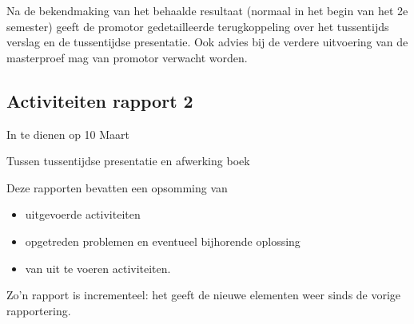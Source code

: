 \documentclass{scrartcl}
\begin{document}
Na de bekendmaking van het behaalde resultaat (normaal in het begin van het 2e semester) geeft de promotor gedetailleerde terugkoppeling over het tussentijds verslag en de tussentijdse presentatie. Ook advies bij de verdere uitvoering van de masterproef mag van promotor verwacht worden.



\subsection{Activiteiten rapport 2}

In te dienen op 10 Maart



Tussen tussentijdse presentatie  en afwerking boek

Deze rapporten bevatten een opsomming van 

\begin{itemize}
\item uitgevoerde activiteiten
\item opgetreden problemen en eventueel bijhorende oplossing
\item van uit te voeren activiteiten.
\end{itemize}
Zo’n rapport is incrementeel: het geeft de nieuwe elementen weer sinds de vorige rapportering.
\end{document}
